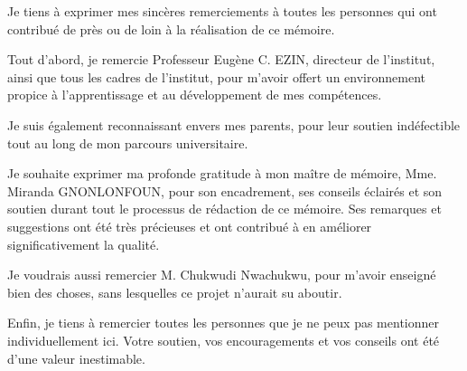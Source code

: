 \remerciements

Je tiens à exprimer mes sincères remerciements à toutes les personnes qui ont contribué de près ou de loin à la réalisation de ce mémoire. 

Tout d'abord, je remercie Professeur Eugène C. EZIN, directeur de l'institut, ainsi que tous les cadres de l'institut, pour m'avoir offert un environnement propice à l'apprentissage et au développement de mes compétences. 

Je suis également reconnaissant envers mes parents, pour leur soutien indéfectible tout au long de mon parcours universitaire.

Je souhaite exprimer ma profonde gratitude à mon maître de mémoire, Mme. Miranda \mbox{GNONLONFOUN}, pour son encadrement, 
ses conseils éclairés et son soutien durant tout le processus de rédaction de ce mémoire. 
Ses remarques et suggestions ont été très précieuses et ont contribué à en améliorer significativement la qualité.

Je voudrais aussi remercier M. Chukwudi Nwachukwu, pour m'avoir enseigné bien des choses, sans lesquelles ce projet n'aurait su aboutir.

Enfin, je tiens à remercier toutes les personnes que je ne peux pas mentionner individuellement ici. 
Votre soutien, vos encouragements et vos conseils ont été d'une valeur inestimable.